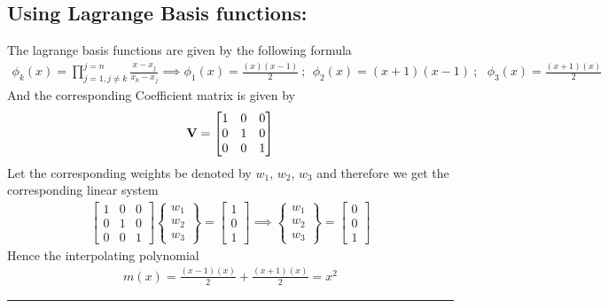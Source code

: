 \subsection*{Using Lagrange Basis functions: }
The lagrange basis functions are given by the following formula
\begin{align*}
\phi_k(x) = \prod_{j=1,j \neq k}^{j=n} \frac{x-x_j}{x_k-x_j} \implies \phi_1(x)  = \frac{(x)(x-1)}{2}\ ;\ \ \phi_2(x)  = (x+1)(x-1)\ ;\ \ \ \phi_3(x)  = \frac{(x+1)(x)}{2}\ \ \ \  
\end{align*}
And the corresponding Coefficient matrix is given by
\begin{align*}
{\bf V} = 
\begin{bmatrix}
1 & 0 & 0 \\
0 & 1 & 0 \\
0 & 0 & 1
\end{bmatrix}
\end{align*}
Let the corresponding weights be denoted by $w_1$, $w_2$, $w_3$ and therefore we get the corresponding linear system 
\begin{align*}
\begin{bmatrix}
1 & 0 & 0 \\
0 & 1 & 0 \\
0 & 0 & 1
\end{bmatrix}
\begin{Bmatrix}
w_1 \\ w_2 \\ w_3
\end{Bmatrix} = 
\begin{bmatrix}
1 \\ 0 \\ 1
\end{bmatrix}
\implies 
\begin{Bmatrix}
w_1 \\ w_2 \\ w_3
\end{Bmatrix} =
\begin{bmatrix}
0\\0\\1
\end{bmatrix}
\end{align*}
Hence the interpolating polynomial 
\begin{align*}
\boxed{m(x) = \frac{(x-1)(x)}{2} + \frac{(x+1)(x)}{2} = x^2}
\end{align*}\hrule




